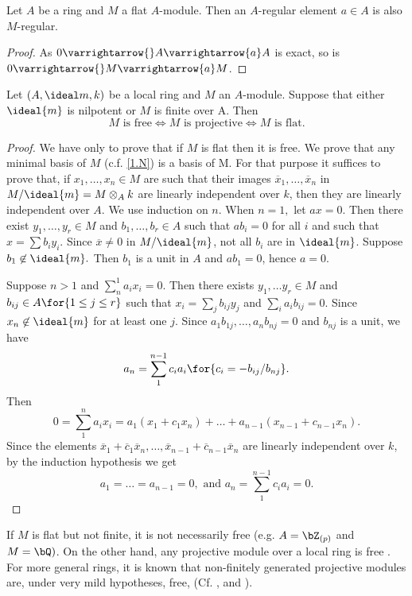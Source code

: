 \documentclass[../main]{subfiles}
\begin{document}
\newparagraph Let $A$ be a ring and $M$ a flat $A$-module. Then an $A$-regular element $a \in A$ is also $M$-regular.
\begin{proof} 
    As $0 \varrightarrow{} A \varrightarrow{a} A$ is exact, so is $0 \varrightarrow{} M \varrightarrow{a} M$.
\end{proof}


\begin{parproposition}\label{pro:3.G}
    Let $(A, \ideal m, k )$ be a local ring and $M$ an $A$-module. Suppose that either $\ideal{m}$ is nilpotent or $M$ is finite over A. Then
    \[
        M \text{ is free} \iff M \text{ is projective} \iff M \text{ is flat.}
    \]
\end{parproposition}

\begin{proof} 
    We have only to prove that if $M$ is flat then it is free. We prove that any minimal basis of $M$ (c.f. \ref{1.N}) is a basis of M. For that purpose it suffices to prove that, if $x_1,\ldots ,x_n \in M$ are such that their images $\overline{x}_1, \ldots , \overline{x}_n$ in $M/ \ideal{m} = M \otimes_A k $ are linearly independent over $k$, then they are linearly independent over $A$. We use induction on $n$. When $n=1,$ let $ax=0$. Then there exist $y_1,\ldots ,y_r\in M$ and $b_1,\ldots ,b_r\in A$ such that $ab_i=0$ for all $i$ and such that $x = \sum b_iy_i$. Since $\overline{x} \neq 0$ in $M/ \ideal{m} $, not all $b_i$ are in $\ideal{m}$. Suppose $b_1 \not\in \ideal{m}.$ Then $b_1$ is a unit in $A$ and $ab_1=0$, hence $a=0$.
    
    Suppose $n>1$ and $\sum_n^{1} a_ix_i=0.$ Then there exists $y_1, \ldots y_r \in M$ and\newline $b_{ij}\in A\for{1 \le j \le r}$ such that $x_i = \sum_j b_{ij}y_j$ and $\sum_ia_ib_{ij}=0$. Since $x_n \not\in \ideal{m}$ for at least one $j$. Since $a_1b_{1j},\ldots ,a_nb_{nj}=0$ and $b_{nj}$ is a unit, we have 
    \[
        a_n = \sum_1^{n-1} c_ia_i \for{c_i = -b_{ij}/b_{nj}}.
    \] 
    Then 
    \[
        0 = \sum_1^n a_ix_i = a_1(x_1+c_1x_n) + \ldots + a_{n-1} (x_{n-1} + c_{n-1}x_n).
    \] 
    Since the elements $\overline{x}_1 + \overline{c}_1\overline{x}_n,\ldots ,\overline{x}_{n-1}+\overline{c}_{n-1}\overline{x}_n$ are linearly independent over $k$, by the induction hypothesis we get 
    \[
        a_1 = \ldots = a_{n-1} = 0, \text{ and } a_n = \sum_1^{n-1} c_ia_i=0. 
    \] 
\end{proof}


\begin{remark*} If $M$ is flat but not finite, it is not necessarily free (e.g. $A=\bZ_{(p)}$ and $M=\bQ)$. On the other hand, any projective module over a local ring is free \cite{kaplansky1958projective}. For more general rings, it is known that non-finitely generated projective modules are, under very mild hypotheses, free, (Cf. \cite{bass1963big}, and \cite{hinohara1963projective}). 
\end{remark*}
\end{document}
